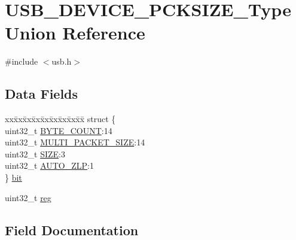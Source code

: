 \hypertarget{union_u_s_b___d_e_v_i_c_e___p_c_k_s_i_z_e___type}{}\section{U\+S\+B\+\_\+\+D\+E\+V\+I\+C\+E\+\_\+\+P\+C\+K\+S\+I\+Z\+E\+\_\+\+Type Union Reference}
\label{union_u_s_b___d_e_v_i_c_e___p_c_k_s_i_z_e___type}


{\ttfamily \#include $<$usb.\+h$>$}

\subsection*{Data Fields}
\begin{DoxyCompactItemize}
\item 
\begin{tabbing}
xx\=xx\=xx\=xx\=xx\=xx\=xx\=xx\=xx\=\kill
struct \{\\
\>uint32\_t \mbox{\hyperlink{union_u_s_b___d_e_v_i_c_e___p_c_k_s_i_z_e___type_a3694230a55acd0de8c0a0fad3d338c41}{BYTE\_COUNT}}:14\\
\>uint32\_t \mbox{\hyperlink{union_u_s_b___d_e_v_i_c_e___p_c_k_s_i_z_e___type_ab48f28a6fa6fe58d13d3ba34a52a44b1}{MULTI\_PACKET\_SIZE}}:14\\
\>uint32\_t \mbox{\hyperlink{union_u_s_b___d_e_v_i_c_e___p_c_k_s_i_z_e___type_a8aff32858d38b4e185cc0bfcb3926c04}{SIZE}}:3\\
\>uint32\_t \mbox{\hyperlink{union_u_s_b___d_e_v_i_c_e___p_c_k_s_i_z_e___type_af3fb7c35c6a108c18d85160f75977586}{AUTO\_ZLP}}:1\\
\} \mbox{\hyperlink{union_u_s_b___d_e_v_i_c_e___p_c_k_s_i_z_e___type_ad9689974abd48929601439ad35212f8a}{bit}}\\

\end{tabbing}\item 
uint32\+\_\+t \mbox{\hyperlink{union_u_s_b___d_e_v_i_c_e___p_c_k_s_i_z_e___type_a6b91636401516a477989a336376d7b40}{reg}}
\end{DoxyCompactItemize}


\subsection{Field Documentation}
\mbox{\label{union_u_s_b___d_e_v_i_c_e___p_c_k_s_i_z_e___type_af3fb7c35c6a108c18d85160f75977586}} 
